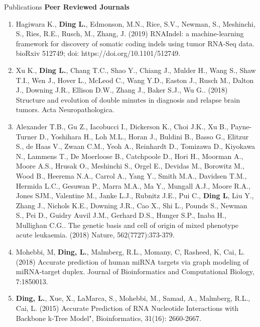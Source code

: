 \documentclass{resume} %
\begin{document}

\begin{rSection}{Publications}
\textbf{Peer Reviewed Journals}
\begin{enumerate}
\item Hagiwara K., \textbf{Ding L.}, Edmonson, M.N., Rice, S.V., Newman, S., Meshinchi, S., Ries, R.E., Rusch, M., Zhang, J. (2019) RNAIndel: a machine-learning framework for discovery of somatic coding indels using tumor RNA-Seq data. bioRxiv 512749; doi: https://doi.org/10.1101/512749.

\item Xu K., \textbf{Ding L.}, Chang T.C., Shao Y., Chiang J., Mulder H., Wang S., Shaw T.I., Wen J., Hover L., McLeod C., Wang Y.D., Easton J., Rusch M., Dalton J., Downing J.R., Ellison D.W., Zhang J., Baker S.J., Wu G.. (2018) Structure and evolution of double minutes in diagnosis and relapse brain tumors. Acta Neuropathologica.

\item Alexander T.B., Gu Z., Iacobucci I., Dickerson K., Choi J.K., Xu B., Payne-Turner D., Yoshihara H., Loh M.L., Horan J., Buldini B., Basso G., Elitzur S., de Haas V., Zwaan C.M., Yeoh A., Reinhardt D., Tomizawa D., Kiyokawa N., Lammens T., De Moerloose B., Catchpoole D., Hori H., Moorman A., Moore A.S., Hrusak O., Meshinchi S., Orgel E., Devidas M., Borowitz M., Wood B., Heerema N.A., Carrol A., Yang Y., Smith M.A., Davidsen T.M., Hermida L.C., Gesuwan P., Marra M.A., Ma Y., Mungall A.J., Moore R.A., Jones SJM., Valentine M., Janke L.J., Rubnitz J.E., Pui C., \textbf{Ding L}, Liu Y., Zhang J., Nichols K.E., Downing J.R., Cao X., Shi L., Pounds S., Newman S., Pei D., Guidry Auvil J.M., Gerhard D.S., Hunger S.P., Inaba H., Mullighan C.G.. The genetic basis and cell of origin of mixed phenotype acute leukaemia. (2018) Nature, 562(7727):373-379.

\item Mohebbi, M, \textbf{Ding, L.}, Malmberg, R.L., Momany, C, Rasheed, K, Cai, L. (2018)
Accurate prediction of human miRNA targets via graph modeling of miRNA-target duplex. Journal of Bioinformatics and Computational Biology, 7:1850013.

\item \textbf{Ding, L.}, Xue, X., LaMarca, S., Mohebbi, M., Samad, A., Malmberg, R.L., Cai, L. (2015) Accurate Prediction of RNA Nucleotide Interactions with Backbone k-Tree Model", Bioinformatics, 31(16): 2660-2667.
\end{enumerate}



\end{rSection}
\end{document}
